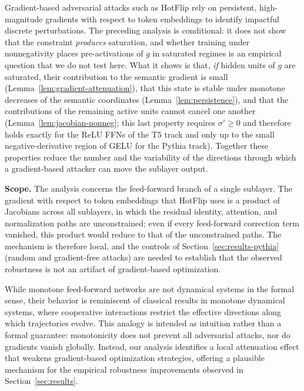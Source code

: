 \documentclass{article}
\theoremstyle{plain}
\theoremstyle{definition}
\theoremstyle{remark}
\begin{document}
Gradient-based adversarial attacks such as HotFlip rely on persistent,
high-magnitude gradients with respect to token embeddings to identify impactful
discrete perturbations. The preceding analysis is conditional: it does not show
that the constraint \emph{produces} saturation, and whether training under
nonnegativity places pre-activations of $g$ in saturated regimes is an empirical
question that we do not test here. What it shows is that, \emph{if} hidden units
of $g$ are saturated, their contribution to the semantic gradient is small
(Lemma~\ref{lem:gradient-attenuation}), that this state is stable under monotone
decreases of the semantic coordinates (Lemma~\ref{lem:persistence}), and that the
contributions of the remaining active units cannot cancel one another
(Lemma~\ref{lem:jacobian-nonneg}; this last property requires $\sigma' \ge 0$ and
therefore holds exactly for the ReLU FFNs of the T5 track and only up to the small
negative-derivative region of GELU for the Pythia track). Together these properties
reduce the number and the variability of the directions through which a
gradient-based attacker can move the sublayer output.

\textbf{Scope.} The analysis concerns the feed-forward branch of a single sublayer.
The gradient with respect to token embeddings that HotFlip uses is a product of
Jacobians across all sublayers, in which the residual identity, attention, and
normalization paths are unconstrained; even if every feed-forward correction term
vanished, this product would reduce to that of the unconstrained paths. The
mechanism is therefore local, and the controls of Section~\ref{sec:results-pythia}
(random and gradient-free attacks) are needed to establish that the observed
robustness is not an artifact of gradient-based optimization.

While monotone feed-forward networks are not dynamical systems in the formal
sense, their behavior is reminiscent of classical results in monotone dynamical
systems, where cooperative interactions restrict the effective directions along
which trajectories evolve. This analogy is intended as intuition rather than a
formal guarantee: monotonicity does not prevent all adversarial attacks, nor do
gradients vanish globally. Instead, our analysis identifies a local attenuation
effect that weakens gradient-based optimization strategies, offering a plausible
mechanism for the empirical robustness improvements observed in
Section~\ref{sec:results}.
\end{document}
